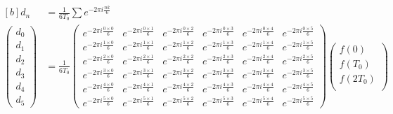 \documentclass[../ap_2013.tex]{subfiles}
\begin{document}
\section{}
\begin{equation}\begin{aligned}[b]
    d_n &= \frac{1}{6T_0}\sum e^{-2\pi i\frac{nk}{6}}\\
    \begin{pmatrix}
        d_0\\
        d_1\\
        d_2\\
        d_3\\
        d_4\\
        d_5
    \end{pmatrix}
    &=\frac{1}{6T_0}\begin{pmatrix}
        e^{-2\pi i\frac{0\times 0}{6}} & e^{-2\pi i\frac{0\times 1}{6}} & e^{-2\pi i\frac{0\times 2}{6}}  &
            e^{-2\pi i\frac{0\times 3}{6}} & e^{-2\pi i\frac{0\times 4}{6}} & e^{-2\pi i\frac{0\times 5}{6}}\\
        e^{-2\pi i\frac{1\times 0}{6}} & e^{-2\pi i\frac{1\times 1}{6}} & e^{-2\pi i\frac{1\times 2}{6}}  &
            e^{-2\pi i\frac{1\times 3}{6}} & e^{-2\pi i\frac{1\times 4}{6}} & e^{-2\pi i\frac{1\times 5}{6}}\\
        e^{-2\pi i\frac{2\times 0}{6}} & e^{-2\pi i\frac{2\times 1}{6}} & e^{-2\pi i\frac{2\times 2}{6}}  &
            e^{-2\pi i\frac{2\times 3}{6}} & e^{-2\pi i\frac{2\times 4}{6}} & e^{-2\pi i\frac{2\times 5}{6}}\\
        e^{-2\pi i\frac{3\times 0}{6}} & e^{-2\pi i\frac{3\times 1}{6}} & e^{-2\pi i\frac{3\times 2}{6}}  &
            e^{-2\pi i\frac{3\times 3}{6}} & e^{-2\pi i\frac{3\times 4}{6}} & e^{-2\pi i\frac{3\times 5}{6}}\\
        e^{-2\pi i\frac{4\times 0}{6}} & e^{-2\pi i\frac{4\times 1}{6}} & e^{-2\pi i\frac{4\times 2}{6}}  &
            e^{-2\pi i\frac{4\times 3}{6}} & e^{-2\pi i\frac{4\times 4}{6}} & e^{-2\pi i\frac{4\times 5}{6}}\\
        e^{-2\pi i\frac{5\times 0}{6}} & e^{-2\pi i\frac{5\times 1}{6}} & e^{-2\pi i\frac{5\times 2}{6}}  &
            e^{-2\pi i\frac{5\times 3}{6}} & e^{-2\pi i\frac{5\times 4}{6}} & e^{-2\pi i\frac{5\times 5}{6}}
    \end{pmatrix}\begin{pmatrix}
        f(0)\\
        f(T_0)\\
        f(2T_0)\\

\end{pmatrix}
\end{aligned}
\end{equation}
\end{document}
